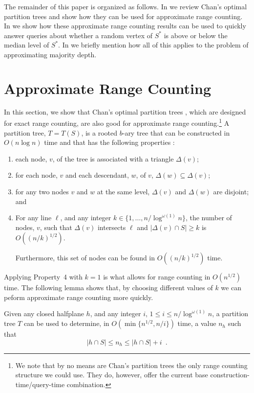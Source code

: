 \documentclass{patmorin}
\begin{document}
The remainder of this paper is organized as follows.  In
 we review Chan's optimal partition trees
and show how they can be used for approximate range counting.
In  we show how these approximate range
counting results can be used to quickly answer queries about whether
a random vertex of $S^*$ is above or below the median level of $S^*$.
In  we briefly mention how all of this applies
to the problem of approximating majority depth.

\section{Approximate Range Counting}

In this section, we show that Chan's optimal partition trees \cite{c12},
which are designed for exact range counting, are also good for approximate
range counting.\footnote{We note that by no means are Chan's partition
trees the only range counting structure we could use.  They do, however,
offer the current base construction-time/query-time combination.}
A partition tree, $T=T(S)$, is a rooted $b$-ary tree that can be
constructed in $O(n\log n)$ time and that has the following properties
\cite[Theorems~3.2 and 4.2]{c12}:

\begin{enumerate}
  \item each node, $v$, of the tree is associated with a triangle $\Delta(v)$;
  \item for each node, $v$ and each descendant, $w$, of $v$,
    $\Delta(w)\subseteq\Delta(v)$;
  \item for any two nodes $v$ and $w$ at the same level, $\Delta(v)$
    and $\Delta(w)$ are disjoint; and
  \item For any line $\ell$, and any integer
    $k\in\{1,\ldots,n/\log^{\omega(1)} n\}$, the number of nodes, $v$,
    such that $\Delta(v)$ intersects $\ell$ and $|\Delta(v)\cap S|\ge k$
    is $O((n/k)^{1/2})$.

    Furthermore, this set of nodes can be found in $O((n/k)^{1/2})$ time.
\end{enumerate}

Applying Property~4 with $k=1$ is what allows for range counting in
$O(n^{1/2})$ time.  The following lemma shows that, by choosing different
values of $k$ we can peform approximate range counting more quickly.

\begin{lem}
  Given any closed halfplane $h$, and any integer $i$, $1\le i\le
  n/\log^{\omega(1)} n$, a partition tree $T$ can be used to determine,
  in $O(\min\{n^{1/2},n/i\})$ time, a value $n_h$ such that 
  \[ |h\cap S| \le n_h \le |h\cap S|+i \enspace .\]
\end{lem}
\end{document}
